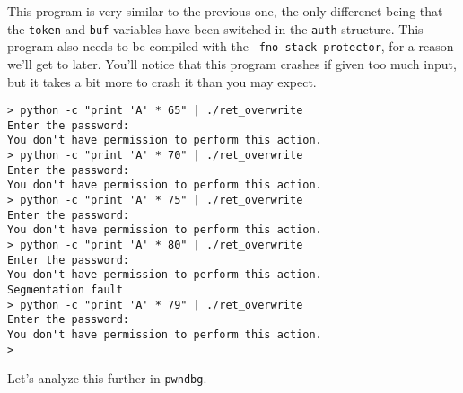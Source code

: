 This program is very similar to the previous one, the only differenct being that
the \texttt{token} and \texttt{buf} variables have been switched in the
\texttt{auth} structure. This program also needs to be compiled with the
\texttt{-fno-stack-protector}, for a reason we'll get to later. You'll notice
that this program crashes if given too much input, but it takes a bit more to
crash it than you may expect.

\begin{lstlisting}
> python -c "print 'A' * 65" | ./ret_overwrite 
Enter the password:
You don't have permission to perform this action.
> python -c "print 'A' * 70" | ./ret_overwrite 
Enter the password:
You don't have permission to perform this action.
> python -c "print 'A' * 75" | ./ret_overwrite 
Enter the password:
You don't have permission to perform this action.
> python -c "print 'A' * 80" | ./ret_overwrite 
Enter the password:
You don't have permission to perform this action.
Segmentation fault
> python -c "print 'A' * 79" | ./ret_overwrite 
Enter the password:
You don't have permission to perform this action.
> 
\end{lstlisting}

Let's analyze this further in \texttt{pwndbg}.


